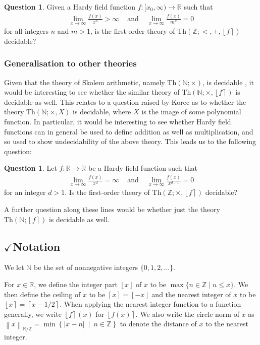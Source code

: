 \documentclass{amsart}
\theoremstyle{definition}
\newtheorem{question}[theorem]{Question}
\newcommand{\ip}[1]{\left\lfloor #1 \right\rfloor }
\newcommand{\nint}[1]{\left\lfloor #1 \right\rceil}
\newcommand{\fpa}[1]{\left\lVert #1 \right\rVert_{\RR/\ZZ}}
\newcommand{\abs}[1]{\left|#1\right|}
\newcommand{\set}[2]{\left\{ #1 \ \middle| \ #2 \right\} }
\newcommand{\ceil}[1]{\left\lceil #1 \right\rceil}
\newcommand{\NN}{\mathbb{N}}
\newcommand{\ZZ}{\mathbb{Z}}
\newcommand{\RR}{\mathbb{R}}
\newcommand{\theory}[1]{\mathrm{Th}(#1)}
\begin{document}
\begin{question}
Given a Hardy field function $f: [x_0,\infty) \to \RR$ such that
\begin{eqnarray}
\lim_{x \to \infty} \frac{f(x)}{x^n} > \infty &\text{ and } & \lim_{x \to \infty} \frac{f(x)}{m^x} = 0
\end{eqnarray}
for all integers $n$ and $m > 1$, is the first-order theory of $\theory{\ZZ; <, +, \nint{f}}$ decidable?
\end{question}

\subsubsection{Generalisation to other theories}

Given that the theory of Skolem arithmetic, namely $\theory{\NN; \times}$, is decidable \cite{Bes-2001}, it would be interesting to see whether the similar theory of $\theory{\NN; \times, \nint{f}}$ is decidable as well. This relates to a question raised by Korec \cite{Korec-2001} as to whether the theory $\theory{\NN; \times, X}$ is decidable, where $X$ is the image of some polynomial function. In particular, it would be interesting to see whether Hardy field functions can in general be used to define addition as well as multiplication, and so used to show undecidability of the above theory. This leads us to the following question:

\begin{question}
Let $f \colon \RR \to \RR$ be a Hardy field function such that
\begin{eqnarray}
\lim_{x \to \infty} \frac{f(x)}{x^d} = \infty &\text{ and } & \lim_{x \to \infty} \frac{f(x)}{x^{d+1}} = 0
\end{eqnarray}
for an integer $d > 1$. Is the first-order theory of $\theory{\ZZ; \times, \nint{f}}$ decidable?
\end{question}

A further question along these lines would be whether just the theory $\theory{\NN; \nint{f}}$ is decidable as well.

\subsection{$\checkmark$Notation}
\label{sec:notation}
We let $\NN$ be the set of nonnegative integers $\{0,1,2, \dots\}$.

For $x \in \RR$, we define the integer part $\ip{x}$ of $x$ to be $\max \{n \in \ZZ \mid n \leq x\}$. We then define the ceiling of $x$ to be $\ceil{x} = \ip{-x}$ and the nearest integer of $x$ to be $\nint{x} = \ceil{x - 1/2}$. When applying the nearest integer function to a function generally, we write $\nint{f}(x)$ for $\nint{f(x)}$. We also write the circle norm of $x$ as $\fpa{x} = \min \set{\abs{x-n}}{n \in \ZZ}$ to denote the distance of $x$ to the nearest integer.
\end{document}
